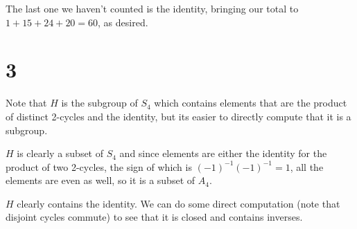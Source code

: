 \documentclass[12pt,letterpaper]{article}
\theoremstyle{definition}
\begin{document}
The last one we haven't counted is the identity, bringing our total to $1 + 15 + 24 + 20 = 60$, as desired.

\section*{3}

Note that $H$ is the subgroup of $S_{4}$ which contains elements that are the product of distinct 2-cycles and the identity, but its easier to directly compute that it is a subgroup.

$H$ is clearly a subset of $S_{4}$ and since elements are either the identity for the product of two 2-cycles, the sign of which is $(-1)^{-1}(-1)^{-1} = 1$, all the elements are even as well, so it is a subset of $A_{4}$.

$H$ clearly contains the identity. We can do some direct computation (note that disjoint cycles commute) to see that it is closed and contains inverses.
\end{document}
